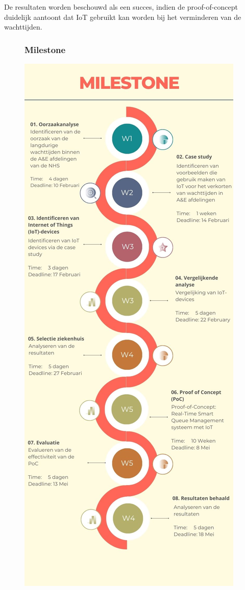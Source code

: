 De resultaten worden beschouwd als een succes, indien de proof-of-concept duidelijk aantoont dat IoT gebruikt kan worden bij het verminderen van de wachttijden.

\begin{figure}[h]
    \centering
    \subsubsection*{Milestone} %
    \includegraphics[width=0.92\linewidth]{img/milestone-4.png}
    \label{fig:Figuur8}
\end{figure}




